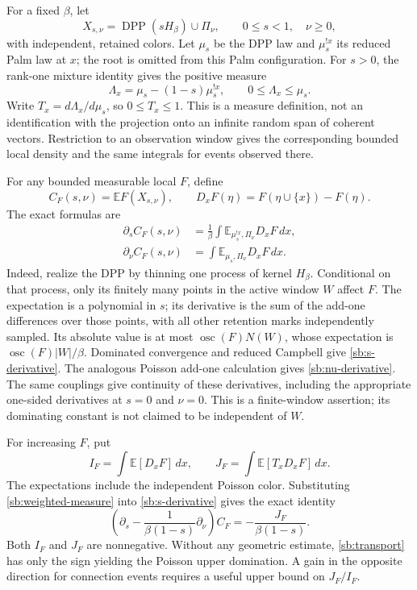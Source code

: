 \documentclass[11pt,a4paper]{article}
\theoremstyle{definition}
\theoremstyle{remark}
\numberwithin{equation}{section}
\begin{document}
For a fixed $\beta$, let
\[
 X_{s,\nu}=\operatorname{DPP}(sH_\beta)\cup\Pi_\nu,
 \qquad 0\le s<1,\quad \nu\ge0,
\]
with independent, retained colors. Let $\mu_s$ be the DPP law and
$\mu_s^{!x}$ its reduced Palm law at $x$; the root is omitted from this
Palm configuration. For $s>0$, the rank-one mixture identity gives the
positive measure
\begin{equation}
 \Lambda_x=\mu_s-(1-s)\mu_s^{!x},
 \qquad 0\le\Lambda_x\le\mu_s.
 \label{sb:weighted-measure}
\end{equation}
Write $T_x=d\Lambda_x/d\mu_s$, so $0\le T_x\le1$. This is a measure
definition, not an identification with the projection onto an
infinite random span of coherent vectors. Restriction to an observation
window gives the corresponding bounded local density and the same
integrals for events observed there.

For any bounded measurable local $F$, define
\[
 C_F(s,\nu)=\mathbb EF(X_{s,\nu}),\qquad
 D_xF(\eta)=F(\eta\cup\{x\})-F(\eta).
\]
The exact formulas are
\begin{align}
 \partial_s C_F(s,\nu)
 &=\frac1\beta\int
     \mathbb E_{\mu_s^{!x},\Pi_\nu}D_xF\,dx,
 \label{sb:s-derivative}\\
 \partial_\nu C_F(s,\nu)
 &=\int\mathbb E_{\mu_s,\Pi_\nu}D_xF\,dx.
 \label{sb:nu-derivative}
\end{align}
Indeed, realize the DPP by thinning one process of kernel $H_\beta$.
Conditional on that process, only its finitely many points in the
active window $W$ affect $F$. The expectation is a polynomial in $s$;
its derivative is the sum of the add-one differences over those
points, with all other retention marks independently sampled. Its
absolute value is at most $\operatorname{osc}(F)N(W)$, whose expectation
is $\operatorname{osc}(F)|W|/\beta$. Dominated convergence and reduced
Campbell give \eqref{sb:s-derivative}. The analogous Poisson add-one
calculation gives \eqref{sb:nu-derivative}. The same couplings give
continuity of these derivatives, including the appropriate one-sided
derivatives at $s=0$ and $\nu=0$. This is a finite-window assertion; its
dominating constant is not claimed to be independent of $W$.

For increasing $F$, put
\[
 I_F=\int\mathbb E[D_xF]\,dx,
 \qquad J_F=\int\mathbb E[T_xD_xF]\,dx.
\]
The expectations include the independent Poisson color. Substituting
\eqref{sb:weighted-measure} into \eqref{sb:s-derivative} gives the exact
identity
\begin{equation}
 \left(\partial_s-\frac{1}{\beta(1-s)}\partial_\nu\right)C_F
       =-\frac{J_F}{\beta(1-s)}.
 \label{sb:transport}
\end{equation}
Both $I_F$ and $J_F$ are nonnegative. Without any geometric estimate,
\eqref{sb:transport} has only the sign yielding the Poisson upper
domination. A gain in the opposite direction for connection events
requires a useful upper bound on $J_F/I_F$.
\end{document}
